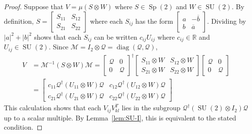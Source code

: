 \documentclass[reqno]{amsart}
\theoremstyle{definition} \newtheorem{example}[theorem]{Example}
\newcommand{\RR}{\mathbb{R}}
\newcommand{\SU}{\operatorname{SU}}
\newcommand{\Sp}{\operatorname{Sp}}
\newcommand{\diag}{\operatorname{diag}}
\newcommand{\M}{\mathcal{M}}
\newcommand{\Q}{\mathcal{Q}}
\begin{document}
\begin{proof} 
Suppose that $V = \mu(S \otimes W)$ where $S \in \Sp(2)$ and $W \in \SU(2)$. By definition, $S = \left[ \begin{smallmatrix} S_{11} & S_{12} \\ S_{21} & S_{22} \end{smallmatrix} \right]$ where each $S_{ij}$ has the form $\left[ \begin{smallmatrix} a & -\overline{b} \\ b & \overline{a} \end{smallmatrix}\right]$. Dividing by $|a|^2+|b|^2$ shows that each $S_{ij}$ can be written $c_{ij}U_{ij}$ where $c_{ij} \in \RR$ and $U_{ij} \in \SU(2)$. Since $\M = I_2 \otimes \Q = \diag(\Q,\Q)$,
\begin{align} \label{eq:K1-2}
V &= \M^{-1}(S \otimes W)\M = \begin{bmatrix} \Q & 0 \\ 0 & \Q \end{bmatrix}^\dagger \begin{bmatrix} S_{11} \otimes W & S_{12} \otimes W \\ S_{21} \otimes W & S_{22} \otimes W \end{bmatrix} \begin{bmatrix} \Q & 0 \\ 0 & \Q \end{bmatrix} \nonumber\\
&= \begin{bmatrix} c_{11}\Q^\dagger(U_{11} \otimes W) \Q & c_{12}\Q^\dagger(U_{12} \otimes W) \Q \\ c_{21}\Q^\dagger(U_{21} \otimes W) \Q & c_{22}\Q^\dagger(U_{22} \otimes W) \Q \end{bmatrix}
\end{align}
This calculation shows that each $V_{ij}V_{kl}^T$ lies in the subgroup $\Q^\dagger (\SU(2) \otimes I_2) \Q$ up to a scalar multiple. By Lemma~\ref{lem:SU-I}, this is equivalent to the stated condition.


\end{proof}
\end{document}
